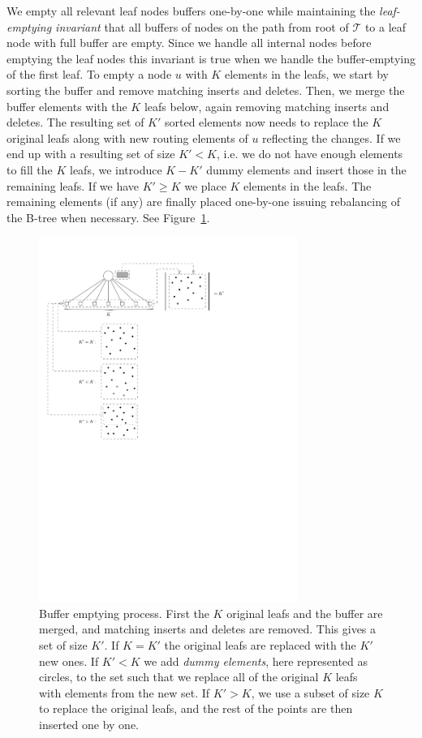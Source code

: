 \documentclass[twoside,11pt,openright]{report}
\begin{document}
We empty all relevant leaf nodes buffers one-by-one while maintaining the \textit{leaf-emptying invariant} that all buffers of nodes on the path from root of $\mathcal{T}$ to a leaf node with full buffer are empty. Since we handle all internal nodes before emptying the leaf nodes this invariant is true when we handle the buffer-emptying of the first leaf. To empty a node $u$ with $K$ elements in the leafs, we start by sorting the buffer and remove matching inserts and deletes. Then, we merge the buffer elements with the $K$ leafs below, again removing matching inserts and deletes. The resulting set of $K'$ sorted elements now needs to replace the $K$ original leafs along with new routing elements of $u$ reflecting the changes. If we end up with a resulting set of size $K' < K$, i.e. we do not have enough elements to fill the $K$ leafs, we introduce $K-K'$ dummy elements and insert those in the remaining leafs. If we have $K' \geq K$ we place $K$ elements in the leafs. The remaining elements (if any) are finally placed one-by-one issuing rebalancing of the B-tree when necessary. See Figure~\ref{fig:buffer_tree_buffer_empty}.

\begin{figure}[H]
	\centering
	\includegraphics[width=0.75\textwidth]{../figures/buffer_tree_buffer_empty}
	\caption{Buffer emptying process. First the $K$ original leafs and the buffer are merged, and matching inserts and deletes are removed. This gives a set of size $K'$. If $K = K'$ the original leafs are replaced with the $K'$ new ones. If $K' < K$ we add \textit{dummy elements}, here represented as circles, to the set such that we replace all of the original $K$ leafs with elements from the new set. If $K' > K$, we use a subset of size $K$ to replace the original leafs, and the rest of the points are then inserted one by one.}
	\label{fig:buffer_tree_buffer_empty}
\end{figure}
\end{document}
